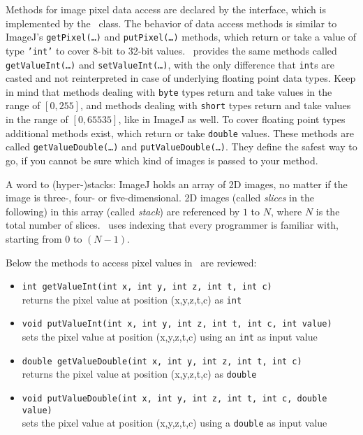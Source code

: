Methods for image pixel data access are declared by the  interface, which is implemented by the \mtbimg\ class. The behavior of data
access methods is similar to ImageJ's {\tt getPixel(\ldots)} and {\tt putPixel(\ldots)} methods, which
return or take a value of type {\tt 'int'} to cover 8-bit to 32-bit values. \mtbimg~provides
the same methods called {\tt getValueInt(\ldots)} and {\tt setValueInt(\ldots)}, with the only
difference that {\tt int}s are casted and not reinterpreted in case of
underlying floating point data types. Keep in mind that methods dealing with {\tt byte} types return and take values in the 
range of $[0,255]$, and methods dealing with {\tt short} types return and take values in the range of $[0,65535]$, like in ImageJ
as well. To cover floating point types additional methods
exist, which return or take {\tt double} values. These methods are called {\tt getValueDouble(\ldots)} and {\tt putValueDouble(\ldots)}. 
They define the safest way to go, if you cannot be sure which kind of images is passed to your method.

A word to (hyper-)stacks: ImageJ holds an array of 2D images, no matter if the
image is three-, four- or five-dimensional. 2D images (called 
\textit{slices} in the following) in this array (called \textit{stack}) are
referenced by $1$ to $N$, where $N$ is the total number of slices. \mtbimg~uses
indexing that every programmer is familiar with, starting from $0$ to $(N-1)$.

Below the methods to access pixel values in \mtbimg~are reviewed:
\begin{itemize}
  \item {\tt int getValueInt(int x, int y, int z, int t, int c)}\\
  		returns the pixel value at position (x,y,z,t,c) as {\tt int}
  \item {\tt void putValueInt(int x, int y, int z, int t, int c, int value)}\\
  		sets the pixel value at position (x,y,z,t,c) using an {\tt int} as input value
  \item {\tt double getValueDouble(int x, int y, int z, int t, int c)}\\
  		returns the pixel value at position (x,y,z,t,c) as {\tt double}
  \item {\tt void putValueDouble(int x, int y, int z, int t, int c, double
  value)}\\
  		sets the pixel value at position (x,y,z,t,c) using a {\tt double} as input value		
\end{itemize}

